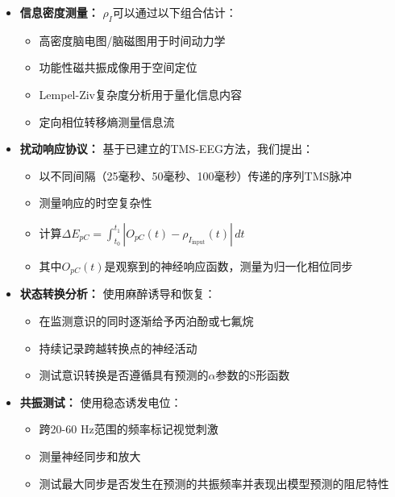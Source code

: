 \documentclass[12pt]{article}
\begin{document}
\begin{itemize}
    \item \textbf{信息密度测量：} $\rho_I$可以通过以下组合估计：
    \begin{itemize}[label=--]
        \item 高密度脑电图/脑磁图用于时间动力学
        \item 功能性磁共振成像用于空间定位
        \item Lempel-Ziv复杂度分析用于量化信息内容\cite{schartner2015,casali2013}
        \item 定向相位转移熵测量信息流\cite{hillebrand2016}
    \end{itemize}
    
    \item \textbf{扰动响应协议：} 基于已建立的TMS-EEG方法\cite{casarotto2016}，我们提出：
    \begin{itemize}[label=--]
        \item 以不同间隔（25毫秒、50毫秒、100毫秒）传递的序列TMS脉冲
        \item 测量响应的时空复杂性
        \item 计算$\Delta E_{pC} = \int_{t_0}^{t_1} |O_{pC}(t) - \rho_{I_{\text{input}}}(t)| \, dt$
        \item 其中$O_{pC}(t)$是观察到的神经响应函数，测量为归一化相位同步
    \end{itemize}
    
    \item \textbf{状态转换分析：} 使用麻醉诱导和恢复：
    \begin{itemize}[label=--]
        \item 在监测意识的同时逐渐给予丙泊酚或七氟烷
        \item 持续记录跨越转换点的神经活动
        \item 测试意识转换是否遵循具有预测的$\alpha$参数的S形函数
    \end{itemize}
    
    \item \textbf{共振测试：} 使用稳态诱发电位：
    \begin{itemize}[label=--]
        \item 跨20-60 Hz范围的频率标记视觉刺激
        \item 测量神经同步和放大
        \item 测试最大同步是否发生在预测的共振频率并表现出模型预测的阻尼特性
    \end{itemize}
\end{itemize}
\end{document}
